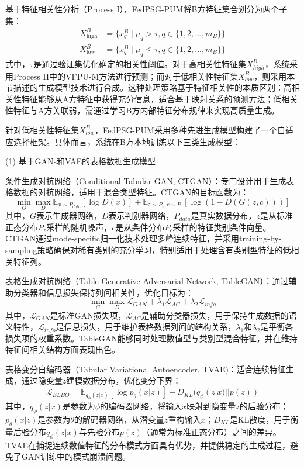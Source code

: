 基于特征相关性分析（Process I），FedPSG-PUM将B方特征集合划分为两个子集：
\begin{equation}
	\begin{split}
		X^B_{\text{high}} &= \{x^B_q \mid \mu_q > \tau, q \in \{1,2,...,m_B\}\} \\
		X^B_{\text{low}} &= \{x^B_q \mid \mu_q \leq \tau, q \in \{1,2,...,m_B\}\}
	\end{split}
\end{equation}
式中，$\tau$是通过验证集优化确定的相关性阈值。对于高相关性特征集$X^B_{high}$，系统采用Process II中的VFPU-M方法进行预测；而对于低相关性特征集$X^B_{low}$，则采用本节描述的生成模型技术进行合成。这种处理策略基于特征相关性的本质区别：高相关性特征能够从A方特征中获得充分信息，适合基于映射关系的预测方法；低相关性特征与A方关联弱，需通过学习B方内部特征分布规律来实现高质量生成。

针对低相关性特征集$X^B_{low}$，FedPSG-PUM采用多种先进生成模型构建了一个自适应选择框架。具体而言，系统在B方本地训练以下三类生成模型：

(1) 基于GANs和VAE的表格数据生成模型

条件生成对抗网络（Conditional Tabular GAN, CTGAN）：专门设计用于生成表格数据的对抗网络，适用于混合类型特征。CTGAN的目标函数为：
\begin{equation}
	\min_G \max_D \mathbb{E}_{x \sim P_{data}}[\log D(x)] + \mathbb{E}_{z \sim P_z, c \sim P_c}[\log(1 - D(G(z, c)))]
\end{equation}
其中，$G$表示生成器网络，$D$表示判别器网络，$P_{data}$是真实数据分布，$z$是从标准正态分布$P_z$采样的随机噪声，$c$是从条件分布$P_c$采样的特征类别条件向量。CTGAN通过mode-specific归一化技术处理多峰连续特征，并采用training-by-sampling策略确保对稀有类别的充分学习，特别适用于处理含有类别型特征的低相关特征列。

表格生成对抗网络（Table Generative Adversarial Network, TableGAN）：通过辅助分类器和信息损失保持列间相关性，优化目标为：
\begin{equation}
	\min_G \max_D \mathcal{L}_{GAN} + \lambda_1 \mathcal{L}_{AC} + \lambda_2 \mathcal{L}_{info}
\end{equation}
其中，$\mathcal{L}_{GAN}$是标准GAN损失项，$\mathcal{L}_{AC}$是辅助分类器损失，用于保持生成数据的语义特性，$\mathcal{L}_{info}$是信息损失，用于维护表格数据列间的结构关系，$\lambda_1$和$\lambda_2$是平衡各损失项的权重系数。TableGAN能够同时处理数值型与类别型混合特征，并在维持特征间相关结构方面表现出色。

表格变分自编码器（Tabular Variational Autoencoder, TVAE)：适合连续特征生成，通过隐变量$z$建模数据分布，优化变分下界：
\begin{equation}
	\mathcal{L}_{ELBO} = \mathbb{E}_{q_\phi(z|x)}[\log p_\theta(x|z)] - D_{KL}(q_\phi(z|x) || p(z))
\end{equation}
其中，$q_\phi(z|x)$是参数为$\phi$的编码器网络，将输入$x$映射到隐变量$z$的后验分布；$p_\theta(x|z)$是参数为$\theta$的解码器网络，从潜变量$z$重构输入$x$；$D_{KL}$是KL散度，用于衡量后验分布$q_\phi(z|x)$与先验分布$p(z)$（通常为标准正态分布）之间的差异。TVAE在捕捉连续数值特征的分布模式方面具有优势，并提供稳定的生成过程，避免了GAN训练中的模式崩溃问题。

